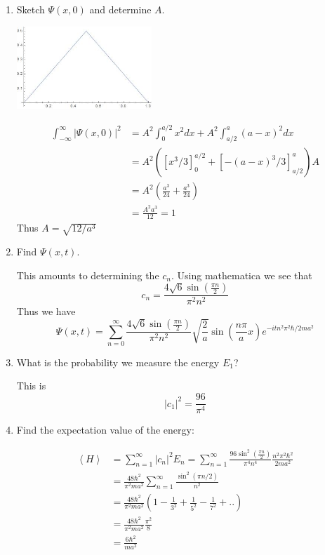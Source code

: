 \documentclass{article}
\newcommand{\bracket}[1]{\left[ #1 \right]}
\newcommand{\paren}[1]{\left( #1 \right)}
\newcommand{\braket}[1]{\left\langle #1 \right\rangle}
\newcommand{\intinf}{\int_{-\infty}^\infty}
\newenvironment{problem}{\begin{enumerate}[label=(\alph*)]}{\end{enumerate}}
\begin{document}
\begin{problem}
\item Sketch $\Psi(x, 0)$ and determine $A$.

  \centerline{\includegraphics[width=2in]{2-7a.jpg}}

  \begin{align*}
    \intinf |\Psi(x, 0)|^2 &= A^2\int_0^{a/2} x^2 dx + A^2 \int_{a/2}^a (a-x)^2 dx \\ 
                           &= A^2 \paren{\bracket{x^3/3}_0^{a/2} + \bracket{-(a-x)^3/3}_{a/2}^a}A \\
                           &= A^2 \paren{\frac{a^3}{24} + \frac{a^3}{24}} \\
                           &= \frac{A^2 a^3}{12} = 1
  \end{align*}
  Thus $A = \sqrt{12/a^3}$

\item Find $\Psi(x, t)$.

  This amounts to determining the $c_n$.
  Using mathematica we see that 
  $$c_n = \frac{4 \sqrt{6} \sin \left(\frac{\pi  n}{2}\right)}{\pi ^2 n^2}$$
  Thus we have 
  $$ \Psi(x, t) = \sum_{n=0}^\infty \frac{4 \sqrt{6} \sin \left(\frac{\pi  n}{2}\right)}{\pi ^2 n^2} \sqrt{\frac{2}{a}} \sin\paren{\frac{n \pi}{a} x} e^{-i t n^2 \pi^2 \hbar / 2 m a^2} $$

\item What is the probability we measure the energy $E_1$?

  This is $$|c_1|^2 = \frac{96}{\pi^4}$$

\item Find the expectation value of the energy:

  \begin{align*}
    \braket{H} &= \sum_{n=1}^\infty |c_n|^2 E_n = \sum_{n=1}^\infty \frac{96 \sin^2 \left(\frac{\pi  n}{2}\right)}{\pi ^4 n^4} \frac{n^2 \pi^2 \hbar^2}{2 m a^2} \\
               &= \frac{48 \hbar^2}{\pi^2 ma^2} \sum_{n=1}^\infty \frac{\sin^2(\pi n / 2)}{n^2} \\
               &= \frac{48 \hbar^2}{\pi^2 ma^2} \paren{1 - \frac1{3^2} + \frac1{5^2} - \frac1{7^2} + ..} \\
               &= \frac{48 \hbar^2}{\pi^2 ma^2} \frac{\pi^2}{8} \\
               &= \frac{6 \hbar^2}{ma^2}
  \end{align*}

\end{problem}
\end{document}
